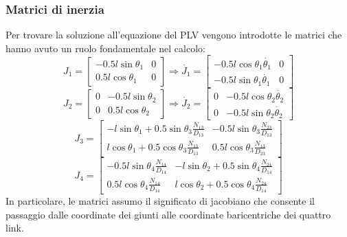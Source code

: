 \subsubsection{Matrici di inerzia}
Per trovare la soluzione all'equazione del PLV vengono introdotte le matrici che hanno avuto un ruolo fondamentale nel calcolo:
\begin{equation*}
    J_1 = \begin{bmatrix}
     -0.5l\sin\theta_1 & 0 \\ 0.5l\cos\theta_1 & 0
    \end{bmatrix} \Rightarrow
    \dot{J_1} = \begin{bmatrix}
     -0.5l\cos\theta_1\dot{\theta_1} & 0 \\ -0.5l\sin\theta_1\dot{\theta_1} & 0
    \end{bmatrix}
\end{equation*}
\begin{equation*}
    J_2 = \begin{bmatrix}
           0 & -0.5l\sin\theta_2 \\
           0 & 0.5l\cos\theta_2 
           \end{bmatrix}
           \Rightarrow
   \dot{J_2} = \begin{bmatrix} 0 & -0.5l\cos\theta_2\dot{\theta_2} \\
           0 & -0.5l\sin\theta_2\dot{\theta_2}
           \end{bmatrix}
\end{equation*}
\begin{equation*}
    J_3 = \begin{bmatrix}
    -l\sin\theta_1+0.5\sin\theta_3 \frac{N_{13}}{D_{13}} & 
    -0.5l\sin\theta_3 \frac{N_{23}}{D_{13}} \\
    l\cos\theta_1+0.5\cos\theta_3 \frac{N_{13}}{D_{13}} & 
    0.5l\cos\theta_3 \frac{N_{13}}{D_{23}}
    \end{bmatrix}
\end{equation*}
\begin{equation*}
    J_4 = \begin{bmatrix}
    -0.5l\sin\theta_4 \frac{N_{14}}{D_{14}} &
    -l\sin\theta_2+0.5\sin\theta_4\frac{N_{24}}{D_{14}} \\
    0.5l\cos\theta_4\frac{N_{14}}{D_{14}} &
    l\cos\theta_2+0.5\cos\theta_4 \frac{N_{24}}{D_{14}}
    \end{bmatrix}
\end{equation*}
In particolare, le matrici assumo il significato di jacobiano che consente il passaggio dalle coordinate dei giunti alle coordinate baricentriche dei quattro link. 
